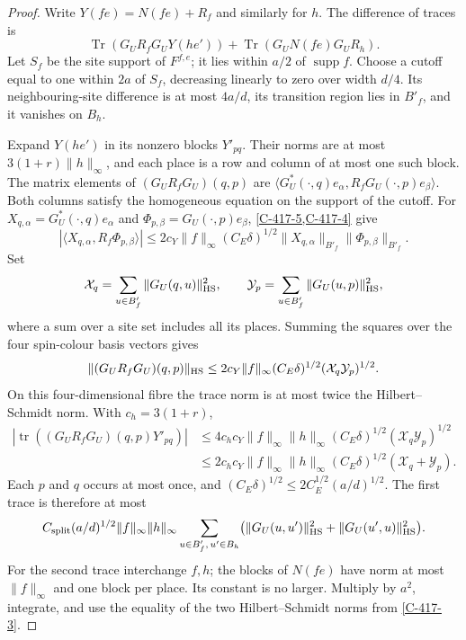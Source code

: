 \documentclass[11pt,letterpaper,reqno]{amsart}
\theoremstyle{definition}
\theoremstyle{remark}
\begin{document}
\begin{proof}
Write $Y(fe)=N(fe)+R_f$ and similarly for $h$.  The
difference of traces is
\[
 \operatorname{Tr}(G_UR_fG_UY(he'))
       +\operatorname{Tr}(G_UN(fe)G_UR_h).
\]
Let $S_f$ be the site support of $F^{f,e}$; it lies within
$a/2$ of $\operatorname{supp}f$.  Choose a cutoff equal
to one within $2a$ of $S_f$, decreasing linearly to zero
over width $d/4$.  Its neighbouring-site difference is
at most $4a/d$, its transition region lies in $B'_f$,
and it vanishes on $B_h$.

Expand $Y(he')$ in its nonzero blocks $Y'_{pq}$.
Their norms are at most $3(1+r)\|h\|_\infty$, and each
place is a row and column of at most one such block.
The matrix elements of $(G_UR_fG_U)(q,p)$ are
$\langle G_U^*(\cdot,q)e_\alpha,
R_fG_U(\cdot,p)e_\beta\rangle$.  Both columns satisfy
the homogeneous equation on the support of the cutoff.
For
$X_{q,\alpha}=G_U^*(\cdot,q)e_\alpha$ and
$\Phi_{p,\beta}=G_U(\cdot,p)e_\beta$,
\cref{C-417-5,C-417-4} give
\[
 |\langle X_{q,\alpha},R_f\Phi_{p,\beta}\rangle|
 \le2c_Y\|f\|_\infty(C_E\delta)^{1/2}
       \|X_{q,\alpha}\|_{B'_f}\|\Phi_{p,\beta}\|_{B'_f}.
\]
Set
\[
 \mathcal X_q=\sum_{u\in B'_f}\|G_U(q,u)\|_{\rm HS}^2,
 \qquad
 \mathcal Y_p=\sum_{u\in B'_f}\|G_U(u,p)\|_{\rm HS}^2,
\]
where a sum over a site set includes all its places.
Summing the squares over the four spin-colour basis
vectors gives
\[
 \|(G_UR_fG_U)(q,p)\|_{\rm HS}
 \le2c_Y\|f\|_\infty(C_E\delta)^{1/2}
                      (\mathcal X_q\mathcal Y_p)^{1/2}.
\]
On this four-dimensional fibre the trace norm is at most
twice the Hilbert--Schmidt norm. With $c_h=3(1+r)$,
\begin{align*}
 |\operatorname{tr}((G_UR_fG_U)(q,p)Y'_{pq})|
 &\le4c_hc_Y\|f\|_\infty\|h\|_\infty
          (C_E\delta)^{1/2}(\mathcal X_q\mathcal Y_p)^{1/2}\\
 &\le2c_hc_Y\|f\|_\infty\|h\|_\infty
          (C_E\delta)^{1/2}(\mathcal X_q+\mathcal Y_p).
\end{align*}
Each $p$ and $q$ occurs at most once, and
$(C_E\delta)^{1/2}\le2C_E^{1/2}(a/d)^{1/2}$.
The first trace is therefore at most
\[
 C_{\rm split}(a/d)^{1/2}\|f\|_\infty\|h\|_\infty
 \sum_{u\in B'_f,\,u'\in B_h}
       \bigl(\|G_U(u,u')\|_{\rm HS}^2
                         +\|G_U(u',u)\|_{\rm HS}^2\bigr).
\]
For the second trace interchange $f,h$; the blocks of
$N(fe)$ have norm at most $\|f\|_\infty$ and one block
per place.  Its constant is no larger.  Multiply by
$a^2$, integrate, and use the equality of the two
Hilbert--Schmidt norms from \cref{C-417-3}.
\end{proof}
\end{document}
